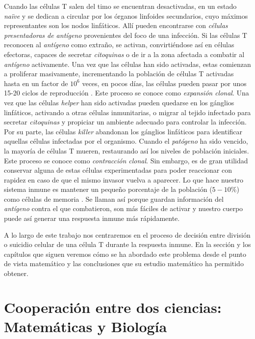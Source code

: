 Cuando las células T salen del timo se encuentran desactivadas, en un estado \textit{naïve} y se dedican a circular por los órganos linfoides secundarios, cuyo máximos representantes son los nodos linfáticos. Allí pueden encontrarse con \textit{células presentadoras de antígeno} provenientes del foco de una infección. Si las células T reconocen al \textit{antígeno} como extraño, se activan, convirtiéndose así en células efectoras, capaces de secretar \textit{citoquinas} o de ir a la zona afectada a combatir al \textit{antígeno} activamente. Una vez que las células han sido activadas, estas comienzan a proliferar masivamente, incrementando la población de células T activadas hasta en un factor de $10^6$ veces, en pocos días, las células pueden pasar por unos 15-20 ciclos de reproducción \citep{JTB}. Este proceso se conoce como \textit{expansión clonal}. Una vez que las células \textit{helper} han sido activadas pueden quedarse en los gánglios linfáticos, activando a otras células inmunitarias, o migrar al tejido infectado para secretar \textit{citoquinas} y propiciar un ambiente adecuado para controlar la infección. Por su parte, las células \textit{killer} abandonan los gánglios linfáticos para identificar aquellas células infectadas por el organismo. Cuando el \textit{patógeno} ha sido vencido, la mayoría de células T mueren, restaurando así los niveles de población iniciales. Este proceso se conoce como \textit{contracción clonal}. Sin embargo, es de gran utilidad conservar alguna de estas células experimentadas para poder reaccionar con rapidez en caso de que el mismo invasor vuelva a aparecer. Lo que hace nuestro sistema inmune es mantener un pequeño porcentaje de la población  ($5-10\%$) como células de memoria \citep{JTB}. Se llaman así porque guardan información del \textit{antígeno} contra el que combatieron, son más fáciles de activar y nuestro cuerpo puede así generar una respuesta inmune más rápidamente.

A lo largo de este trabajo nos centraremos en el proceso de decisión entre división o suicidio celular de una célula T durante la respuesta inmune. En la sección y los capítulos que siguen veremos cómo se ha abordado este problema desde el punto de vista matemático y las conclusiones que su estudio matemático ha permitido obtener. 


\section{Cooperación entre dos ciencias: Matemáticas y Biología}
\label{sec:coop}

